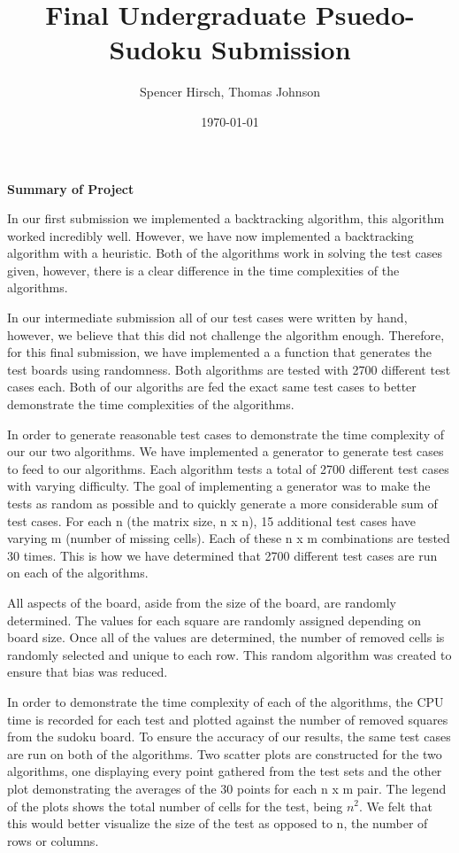 \documentclass{article}
\begin{document}
\title{\textbf{Final Undergraduate Psuedo-Sudoku Submission}}
\author{Spencer Hirsch, Thomas Johnson}
\date{\today}

\maketitle

\noindent \textbf{Summary of Project}

\medskip

In our first submission we implemented a backtracking algorithm, this
algorithm worked incredibly well. However, we have now implemented a 
backtracking algorithm with a heuristic. Both of the algorithms work
in solving the test cases given, however, there is a clear difference
in the time complexities of the algorithms. 

In our intermediate submission all of our test cases were written by hand,
however, we believe that this did not challenge the algorithm enough. Therefore,
for this final submission, we have implemented a a function that generates the
test boards using randomness. Both algorithms are tested with 2700 different
test cases each. Both of our algoriths are fed the exact same test cases to better
demonstrate the time complexities of the algorithms.

In order to generate reasonable test cases to demonstrate the time complexity of 
our our two algorithms. We have implemented a generator to generate test cases to 
feed to our algorithms. Each algorithm tests a total of 2700 different test cases 
with varying difficulty. The goal of implementing a generator was to make the 
tests as random as possible and to quickly generate a more considerable sum of 
test cases. For each n (the matrix size, n x n), 15 additional test cases have 
varying m (number of missing cells). Each of these n x m combinations are tested 
30 times. This is how we have determined that 2700 different test cases are run 
on each of the algorithms. 

All aspects of the board, aside from the size of the board, are randomly determined. 
The values for each square are randomly assigned depending on board size. Once all of 
the values are determined, the number of removed cells is randomly selected and 
unique to each row. This random algorithm was created to ensure that bias was reduced. 

In order to demonstrate the time complexity of each of the algorithms, the CPU time 
is recorded for each test and plotted against the number of removed squares from 
the sudoku board. To ensure the accuracy of our results, the same test cases are 
run on both of the algorithms. Two scatter plots are constructed for the two algorithms,
one displaying every point gathered from the test sets and the other plot demonstrating
the averages of the 30 points for each n x m pair. The legend of the plots shows the total
number of cells for the test, being $n^2$. We felt that this would better visualize the size
of the test as opposed to n, the number of rows or columns.
\end{document}
